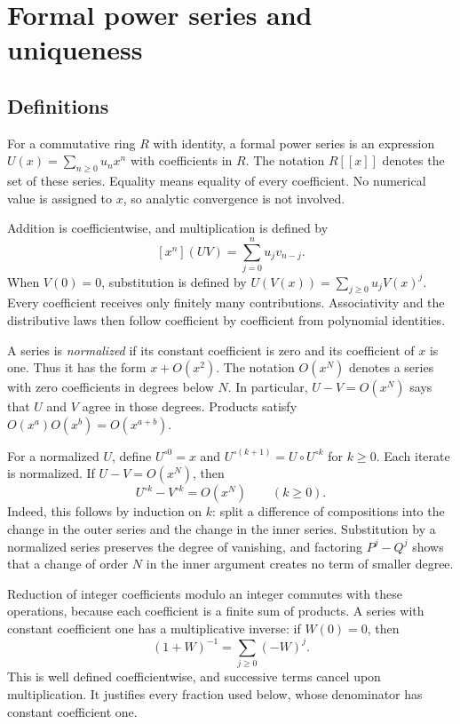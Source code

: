 \documentclass[11pt,a4paper]{article}
\theoremstyle{remark}\newtheorem{remark}[theorem]{Remark}
\newcommand{\coeff}[2]{[x^{#1}]#2}
\begin{document}
\section{Formal power series and uniqueness}\label{sec:formal}

\subsection{Definitions}

For a commutative ring $R$ with identity, a formal power series is an
expression $U(x)=\sum_{n\ge0}u_nx^n$ with coefficients in $R$.
The notation $R[[x]]$ denotes the set of these series. Equality means
equality of every coefficient. No numerical value is assigned to $x$,
so analytic convergence is not involved.

Addition is coefficientwise, and multiplication is defined by
\[
\coeff{n}{(UV)}=\sum_{j=0}^n u_jv_{n-j}.
\]
When $V(0)=0$, substitution is defined by
$U(V(x))=\sum_{j\ge0}u_jV(x)^j$. Every coefficient receives only
finitely many contributions. Associativity and the distributive laws
then follow coefficient by coefficient from polynomial identities.

A series is \emph{normalized} if its constant coefficient is zero
and its coefficient of $x$ is one. Thus it has the form $x+O(x^2)$.
The notation $O(x^N)$ denotes a series with zero coefficients in
degrees below $N$. In particular, $U-V=O(x^N)$ says that $U$ and $V$
agree in those degrees. Products satisfy
$O(x^a)O(x^b)=O(x^{a+b})$.

For a normalized $U$, define $U^{\circ0}=x$ and
$U^{\circ(k+1)}=U\circ U^{\circ k}$ for $k\ge0$.
Each iterate is normalized. If $U-V=O(x^N)$, then
\begin{equation}\label{eq:iterate-congruence}
U^{\circ k}-V^{\circ k}=O(x^N)\qquad(k\ge0).
\end{equation}
Indeed, this follows by induction on $k$: split a difference of
compositions into the change in the outer series and the change in
the inner series. Substitution by a normalized series preserves the
degree of vanishing, and factoring $P^j-Q^j$ shows that a change of
order $N$ in the inner argument creates no term of smaller degree.

Reduction of integer coefficients modulo an integer commutes with
these operations, because each coefficient is a finite sum of
products. A series with constant coefficient one has a multiplicative
inverse: if $W(0)=0$, then
\[
(1+W)^{-1}=\sum_{j\ge0}(-W)^j.
\]
This is well defined coefficientwise, and successive terms cancel
upon multiplication. It justifies every fraction used below, whose
denominator has constant coefficient one.
\end{document}
